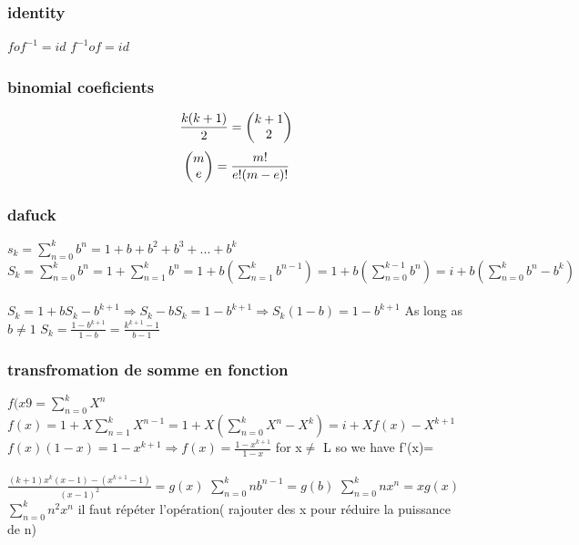 \documentclass[a4paper,10pt]{article}
\begin{document}
{\subsubsection{identity}
$fof^{-1}=id$
\newline
$f^{-1}of=id$
\subsubsection{binomial coeficients}
\[\frac{k(k+1)}{2}=
\begin{pmatrix}
k+1\cr
2
\end{pmatrix}
\]
\newline
\[
\begin{pmatrix}
m\cr
e
\end{pmatrix}
=\frac{m!}{e!(m-e)!}
\]
\subsubsection{dafuck}
$s_k=\sum_{n=0}^kb^n=1+b+b^2+b^3+...+b^k$
\newline
$S_k=\sum_{n=0}^kb^n=1+\sum_{n=1}^kb^n=1+b(\sum_{n=1}^kb^{n-1})=1+b(\sum_{n=0}^{k-1}b^n)=i+b(\sum_{n=0}^kb^n-b^k)$
\paragraph{}
$S_k=1+bS_k-b^{k+1}\Longrightarrow S_k-bS_k=1-b^{k+1}\Longrightarrow S_k(1-b)=1-b^{k+1}$
\newline
As long as $b\neq 1$
\newline
$S_k=\frac{1-b^{k+1}}{1-b}=\frac{k^{k+1}-1}{b-1}$
\subsubsection{transfromation de somme en fonction}
$f(x9=\sum_{n=0}^{k}X^n$
\newline
$f(x)=1+X\sum_{n=1}^kX^{n-1}=1+X(\sum_{n=0}^kX^n-X^k)=i+Xf(x)-X^{k+1}$
\newline
$f(x)(1-x)=1-x^{k+1}\Rightarrow f(x)=\frac{1-x^{k+1}}{1-x}$ for x$\neq$ L
\newline
so we have f'(x)=
\paragraph{}
$\frac{(k+1)x^k(x-1)-(x^{k+1}-1)}{(x-1)^2}=g(x)$
\newline
$\sum_{n=0}^knb^{n-1}=g(b)$
\newline
$\sum_{n=0}^knx^n=xg(x)$
\newline
$\sum_{n=0}^kn^2x^n$ il faut répéter l'opération( rajouter des x pour réduire la puissance de n)
}
\end{document}
